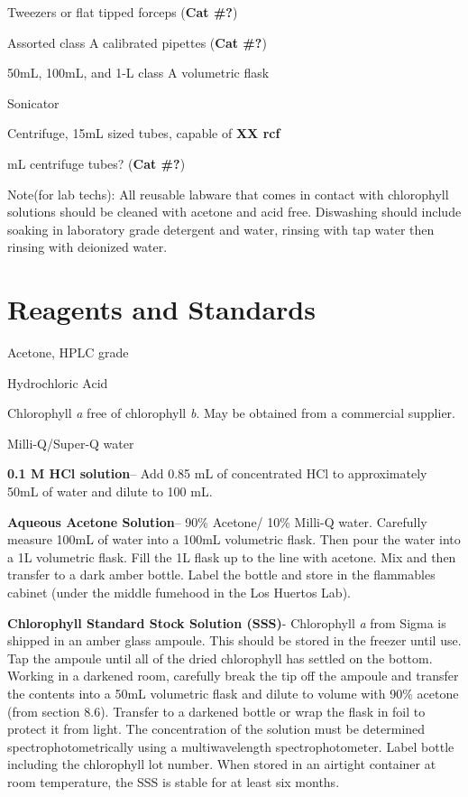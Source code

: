 \documentclass[12pt]{../SOP3_alpha}
\begin{document}
\NP Tweezers or flat tipped forceps (\textbf{Cat \#?})

\NP Assorted class A calibrated pipettes (\textbf{Cat \#?})

\NP 50mL, 100mL, and 1-L class A volumetric flask

\NP Sonicator %

\NP Centrifuge, 15mL sized tubes, capable of \textbf{XX rcf}

 mL centrifuge tubes? (\textbf{Cat \#?})%


\NP Note(for lab techs): All reusable labware that comes in contact with chlorophyll solutions should be cleaned with acetone and acid free. Diswashing should include soaking in laboratory grade detergent and water, rinsing with tap water then rinsing with deionized water. 

\section{Reagents and Standards}
\NP Acetone, HPLC grade

\NP Hydrochloric Acid

\NP Chlorophyll \textit{a} free of chlorophyll \textit{b}. May be obtained from a commercial supplier.

\NP Milli-Q/Super-Q water

\NP \textbf{0.1 M HCl solution}-- Add 0.85 mL of concentrated HCl to approximately 50mL of water and dilute to 100 mL. 

\NP \textbf{Aqueous Acetone Solution}-- 90\% Acetone/ 10\% Milli-Q water. Carefully measure 100mL of water into a 100mL volumetric flask. Then pour the water into a 1L volumetric flask. Fill the 1L flask up to the line with acetone. Mix and then transfer to a dark amber bottle. Label the bottle and store in the flammables cabinet (under the middle fumehood in the Los Huertos Lab). 

\NP \textbf{Chlorophyll Standard Stock Solution (SSS)}- Chlorophyll \textit{a} from Sigma is shipped in an amber glass ampoule. This should be stored in the freezer until use. Tap the ampoule until all of the dried chlorophyll has settled on the bottom. Working in a darkened room, carefully break the tip off the ampoule and transfer the contents into a 50mL volumetric flask and dilute to volume with 90\% acetone (from section 8.6). Transfer to a darkened bottle or wrap the flask in foil to protect it from light. The concentration of the solution must be determined spectrophotometrically using a multiwavelength spectrophotometer. Label bottle including the chlorophyll lot number. When stored in an airtight container at room temperature, the SSS is stable for at least six months.
\end{document}
